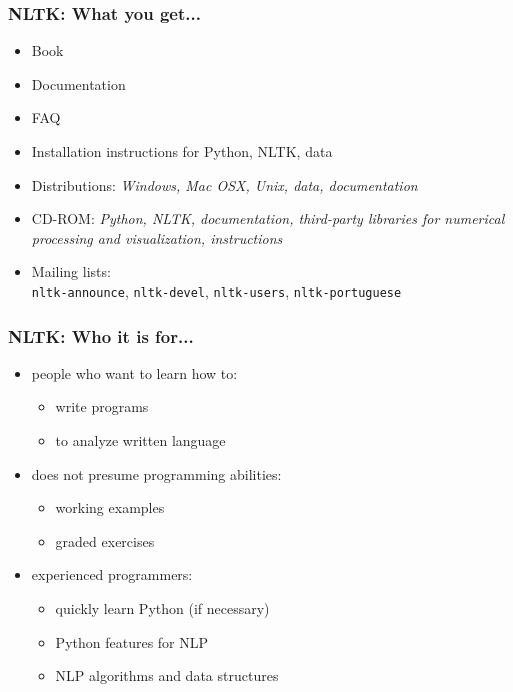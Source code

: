 \documentclass{beamer}             %
\begin{document}
\begin{frame}
  \frametitle{NLTK: What you get...}
  \begin{itemize}
    \item Book
    \item Documentation
    \item FAQ
    \item Installation instructions for Python, NLTK, data
    \item Distributions:
      \textit{Windows, Mac OSX, Unix, data, documentation}
    \item CD-ROM:
      \textit{Python, NLTK, documentation, third-party libraries for numerical
        processing and visualization, instructions}
    \item Mailing lists:\\
      \texttt{nltk-announce}, 
      \texttt{nltk-devel}, 
      \texttt{nltk-users}, 
      \texttt{nltk-portuguese}
  \end{itemize}
\end{frame}

\begin{frame}
  \frametitle{NLTK: Who it is for...}
  \begin{itemize}
    \item people who want to learn how to:
    \begin{itemize}
      \item write programs
      \item to analyze written language
    \end{itemize}
    \item does not presume programming abilities:
    \begin{itemize}
      \item working examples
      \item graded exercises
    \end{itemize}
    \item experienced programmers:
    \begin{itemize}
      \item quickly learn Python (if necessary)
      \item Python features for NLP
      \item NLP algorithms and data structures
    \end{itemize}
  \end{itemize}
\end{frame}
\end{document}
